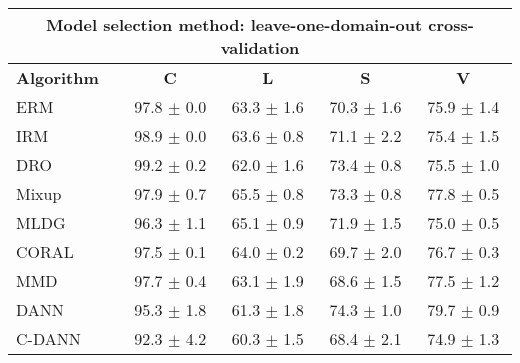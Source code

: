 \documentclass{article}
\begin{document}
\begin{center}
\begin{tabular}{lcccc}
\toprule
\multicolumn{5}{c}{\textbf{Model selection method: leave-one-domain-out cross-validation}} \\
\midrule
\textbf{Algorithm}    & \textbf{C}                & \textbf{L}                & \textbf{S}                & \textbf{V}                \\
\midrule
ERM                       & 97.8 $\pm$ 0.0            & 63.3 $\pm$ 1.6            & 70.3 $\pm$ 1.6            & 75.9 $\pm$ 1.4            \\
IRM                       & 98.9 $\pm$ 0.0            & 63.6 $\pm$ 0.8            & 71.1 $\pm$ 2.2            & 75.4 $\pm$ 1.5            \\
DRO                 & 99.2 $\pm$ 0.2            & 62.0 $\pm$ 1.6            & 73.4 $\pm$ 0.8            & 75.5 $\pm$ 1.0            \\
Mixup                     & 97.9 $\pm$ 0.7            & 65.5 $\pm$ 0.8            & 73.3 $\pm$ 0.8            & 77.8 $\pm$ 0.5            \\
MLDG                      & 96.3 $\pm$ 1.1            & 65.1 $\pm$ 0.9            & 71.9 $\pm$ 1.5            & 75.0 $\pm$ 0.5            \\
CORAL                     & 97.5 $\pm$ 0.1            & 64.0 $\pm$ 0.2            & 69.7 $\pm$ 2.0            & 76.7 $\pm$ 0.3            \\
MMD                       & 97.7 $\pm$ 0.4            & 63.1 $\pm$ 1.9            & 68.6 $\pm$ 1.5            & 77.5 $\pm$ 1.2            \\
DANN                       & 95.3 $\pm$ 1.8            & 61.3 $\pm$ 1.8            & 74.3 $\pm$ 1.0            & 79.7 $\pm$ 0.9            \\
C-DANN                   & 92.3 $\pm$ 4.2            & 60.3 $\pm$ 1.5            & 68.4 $\pm$ 2.1            & 74.9 $\pm$ 1.3            \\
\bottomrule
\end{tabular}
\end{center}
\end{document}
